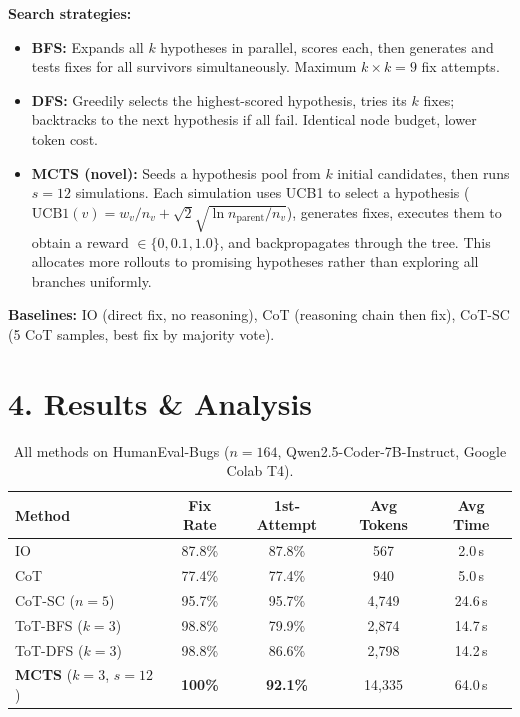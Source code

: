 \documentclass[11pt,letterpaper]{article}
\begin{document}
\textbf{Search strategies:}
\begin{itemize}[noitemsep,topsep=1pt]
  \item \textbf{BFS:} Expands all $k$ hypotheses in parallel, scores each, then generates
        and tests fixes for all survivors simultaneously. Maximum $k \times k = 9$ fix attempts.
  \item \textbf{DFS:} Greedily selects the highest-scored hypothesis, tries its $k$ fixes;
        backtracks to the next hypothesis if all fail. Identical node budget, lower token cost.
  \item \textbf{MCTS (novel):} Seeds a hypothesis pool from $k$ initial candidates, then runs
        $s{=}12$ simulations. Each simulation uses UCB1 to select a hypothesis
        ($\mathrm{UCB1}(v) = w_v/n_v + \sqrt{2}\sqrt{\ln n_{\text{parent}}/n_v}$),
        generates fixes, executes them to obtain a reward $\in\{0, 0.1, 1.0\}$, and
        backpropagates through the tree. This allocates more rollouts to promising hypotheses
        rather than exploring all branches uniformly.
\end{itemize}

\textbf{Baselines:} IO (direct fix, no reasoning), CoT (reasoning chain then fix),
CoT-SC (5 CoT samples, best fix by majority vote).

\section*{4. Results \& Analysis}

\begin{table}[h!]
\centering
\small
\caption{All methods on HumanEval-Bugs ($n{=}164$, Qwen2.5-Coder-7B-Instruct, Google Colab T4).}
\label{tab:results}
\begin{tabular}{@{}lcccc@{}}
\toprule
\textbf{Method} & \textbf{Fix Rate} & \textbf{1st-Attempt} & \textbf{Avg Tokens} & \textbf{Avg Time} \\
\midrule
IO                         & 87.8\%           & 87.8\%               & 567                 & 2.0\,s \\
CoT                        & 77.4\%           & 77.4\%               & 940                 & 5.0\,s \\
CoT-SC ($n{=}5$)           & 95.7\%           & 95.7\%               & 4,749               & 24.6\,s \\
ToT-BFS ($k{=}3$)          & 98.8\%           & 79.9\%               & 2,874               & 14.7\,s \\
ToT-DFS ($k{=}3$)          & 98.8\%           & 86.6\%               & 2,798               & 14.2\,s \\
\textbf{MCTS} ($k{=}3$, $s{=}12$) & \textbf{100\%} & \textbf{92.1\%} & 14,335 & 64.0\,s \\
\bottomrule
\end{tabular}
\end{table}
\end{document}
